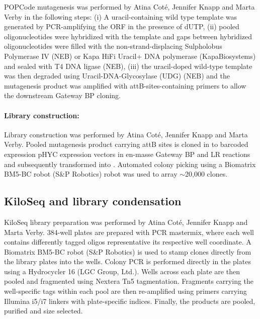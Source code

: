 POPCode mutagenesis was performed by Atina Cot\'e, Jennifer Knapp and Marta Verby in the following steps: (i) A uracil-containing wild type template was generated by PCR-amplifying the ORF in the presence of dUTP, (ii) pooled oligonucleotides were hybridized with the template and gaps between hybridized oligonucleotides were filled with the non-strand-displacing Sulpholobus Polymerase IV (NEB) or Kapa HiFi Uracil+ DNA polymerase (KapaBiosystems) and sealed with T4 DNA ligase (NEB), (iii) the uracil-doped wild-type template was then degraded using Uracil-DNA-Glycosylase (UDG) (NEB) and the mutagenesis product was amplified with attB-sites-containing primers to allow the downstream Gateway BP cloning.

\paragraph{Library construction:} Library construction was performed by Atina Cot\'e, Jennifer Knapp and Marta Verby. Pooled mutagenesis product carrying attB sites is cloned in to barcoded expression pHYC expression vectors in en-masse Gateway BP and LR reactions and subsequently transformed into . Automated colony picking using a Biomatrix BM5-BC robot (S\&P Robotics) robot was used to array $\sim$20,000 clones.

\subsection{KiloSeq and library condensation}

KiloSeq library preparation was performed by Atina Cot\'e, Jennifer Knapp and Marta Verby. 384-well plates are prepared with PCR mastermix, where each well contains differently tagged oligos representative its respective well coordinate. A Biomatrix BM5-BC robot (S\&P Robotics) is used to stamp clones directly from the library plates into the wells. Colony PCR is performed directly in the plates using a Hydrocycler 16 (LGC Group, Ltd.). Wells across each plate are then pooled and fragmented using Nextera Tn5 tagmentation. Fragments carrying the well-specific tags within each pool are then re-amplified using primers carrying Illumina i5/i7 linkers with plate-specific indices. Finally, the products are pooled, purified and size selected.


